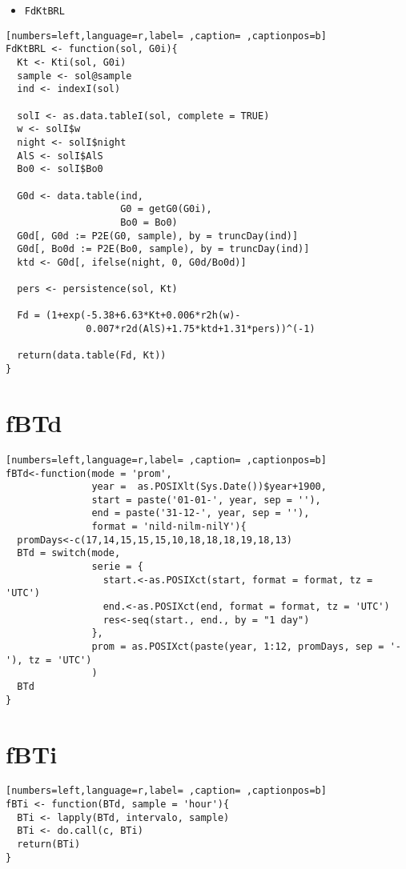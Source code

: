 \begin{itemize}
\item \texttt{FdKtBRL}
\end{itemize}
\begin{lstlisting}[numbers=left,language=r,label= ,caption= ,captionpos=b]
FdKtBRL <- function(sol, G0i){
  Kt <- Kti(sol, G0i)
  sample <- sol@sample
  ind <- indexI(sol)

  solI <- as.data.tableI(sol, complete = TRUE)
  w <- solI$w
  night <- solI$night
  AlS <- solI$AlS
  Bo0 <- solI$Bo0

  G0d <- data.table(ind,
                    G0 = getG0(G0i),
                    Bo0 = Bo0)
  G0d[, G0d := P2E(G0, sample), by = truncDay(ind)]
  G0d[, Bo0d := P2E(Bo0, sample), by = truncDay(ind)]
  ktd <- G0d[, ifelse(night, 0, G0d/Bo0d)]

  pers <- persistence(sol, Kt)

  Fd = (1+exp(-5.38+6.63*Kt+0.006*r2h(w)-
              0.007*r2d(AlS)+1.75*ktd+1.31*pers))^(-1)

  return(data.table(Fd, Kt))
}
\end{lstlisting}
\section{fBTd}
\label{sec:org7571b9f}
\begin{lstlisting}[numbers=left,language=r,label= ,caption= ,captionpos=b]
fBTd<-function(mode = 'prom',
               year =  as.POSIXlt(Sys.Date())$year+1900,
               start = paste('01-01-', year, sep = ''),
               end = paste('31-12-', year, sep = ''), 
               format = 'nild-nilm-nilY'){
  promDays<-c(17,14,15,15,15,10,18,18,18,19,18,13)
  BTd = switch(mode,
               serie = {
                 start.<-as.POSIXct(start, format = format, tz = 'UTC')
                 end.<-as.POSIXct(end, format = format, tz = 'UTC')
                 res<-seq(start., end., by = "1 day")
               },
               prom = as.POSIXct(paste(year, 1:12, promDays, sep = '-'), tz = 'UTC')
               )
  BTd
}
\end{lstlisting}
\section{fBTi}
\label{sec:org671c9da}
\begin{lstlisting}[numbers=left,language=r,label= ,caption= ,captionpos=b]
fBTi <- function(BTd, sample = 'hour'){
  BTi <- lapply(BTd, intervalo, sample)
  BTi <- do.call(c, BTi)
  return(BTi)
}
\end{lstlisting}
